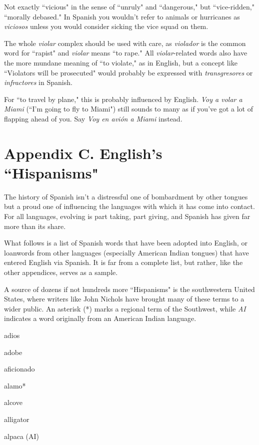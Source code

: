  Not exactly ``vicious" in the sense of ``unruly" and
``dangerous," but ``vice-ridden," ``morally debased." In Spanish you
wouldn't refer to animals or hurricanes as \emph{viciosos} unless you would
consider sicking the vice squad on them.

 The whole \emph{violar} complex should be used with
care, as \emph{violador} is the common word for ``rapist" and \emph{violar} means
``to rape." All \emph{violar}-related words also have the more mundane meaning of ``to violate," as in English, but a concept like ``Violators will be
prosecuted" would probably be expressed with \emph{transgresores} or \emph{infractores} in Spanish.

 For ``to travel by plane," this is probably influenced
by English. \emph{Voy a volar a Miami} (``I'm going to fly to Miami") still
sounds to many as if you've got a lot of flapping ahead of you. Say \emph{Voy
en avión a Miami} instead.

\chapter{Appendix C. English's ``Hispanisms"}

The history of Spanish isn't a distressful one of bombardment
by other tongues but a proud one of influencing the languages with
which it has come into contact. For all languages, evolving is part taking, part giving, and Spanish has given far more than its share.

What follows is a list of Spanish words that have been adopted
into English, or loanwords from other languages (especially American
Indian tongues) that have entered English via Spanish. It is far from a
complete list, but rather, like the other appendices, serves as a sample.

A source of dozens if not hundreds more ``Hispanisms" is the
southwestern United States, where writers like John Nichols have
brought many of these terms to a wider public. An asterisk (*) marks a
regional term of the Southwest, while \emph{AI} indicates a word originally
from an American Indian language.

\bsk

adios

adobe

aficionado

alamo*

alcove

alligator

alpaca (AI)

